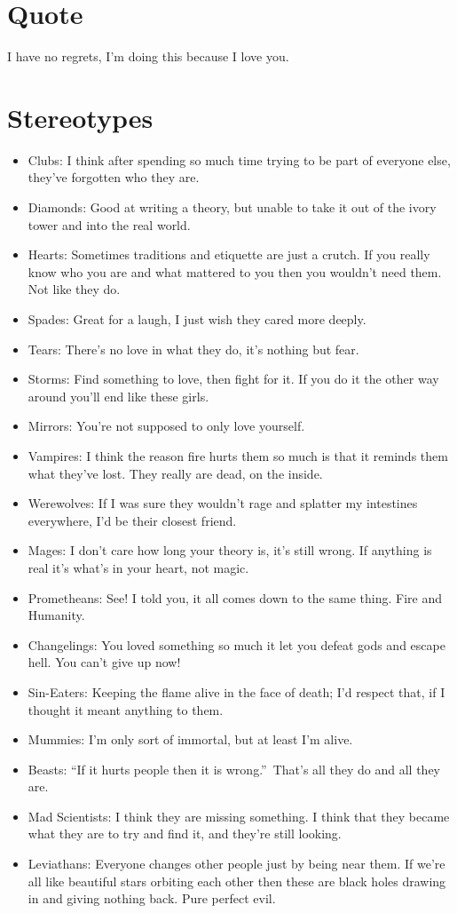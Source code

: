 \section*{Quote}

I have no regrets, I'm doing this because I love you.

\section*{Stereotypes}

\begin{itemize}
\item Clubs: I think after spending so much time trying to be part of everyone else, they've forgotten who they are.
\item Diamonds: Good at writing a theory, but unable to take it out of the ivory tower and into the real world.
\item Hearts: Sometimes traditions and etiquette are just a crutch. If you really know who you are and what mattered to you then you wouldn't need them. Not like they do.
\item Spades: Great for a laugh, I just wish they cared more deeply.
\item Tears: There's no love in what they do, it's nothing but fear.
\item Storms: Find something to love, then fight for it. If you do it the other way around you'll end like these girls. 
\item Mirrors: You're not supposed to only love yourself.

\item Vampires: I think the reason fire hurts them so much is that it reminds them what they've lost. They really are dead, on the inside.
\item Werewolves: If I was sure they wouldn't rage and splatter my intestines everywhere, I'd be their closest friend.
\item Mages: I don't care how long your theory is, it's still wrong. If anything is real it's what's in your heart, not magic.
\item Prometheans: See! I told you, it all comes down to the same thing. Fire and Humanity.
\item Changelings: You loved something so much it let you defeat gods and escape hell. You can't give up now!
\item Sin-Eaters: Keeping the flame alive in the face of death; I'd respect that, if I thought it meant anything to them.
\item Mummies: I'm only sort of immortal, but at least I'm alive. 
\item Beasts: \textquotedblleft If it hurts people then it is wrong.\textquotedblright\, That's all they do and all they are.
\item Mad Scientists: I think they are missing something. I think that they became what they are to try and find it, and they're still looking.
\item Leviathans: Everyone changes other people just by being near them. If we're all like beautiful stars orbiting each other then these are black holes drawing in and giving nothing back. Pure perfect evil.


\end{itemize}

